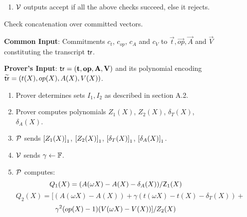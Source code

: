\begin{figure}[htbp]
\begin{mdframed}
{\begin{enumerate}[leftmargin=1em, label=\arabic*.]
\begin{itemize}[leftmargin=1em]
					\item $\kzgverify(\srs,\gone{f},  \val{s}{Z} + r\val{s}{Q}, s,\Pi_f)$.
					\item $\val{s}{Q}\cdot \val{s}{Z} = \val{s^3}{h}-\val{s}{v}-\gamma \val{\omega^m s}{v}-\gamma^2\val{\omega^{2m}s}{v}$.
				\end{itemize}
				\item $\mathcal{V}$ outputs accept if all the above checks succeed, else it rejects.
			\end{enumerate}
		}
	\end{mdframed}
	\caption{Check concatenation over committed vectors.}
	\label{fig:concatenation}
\end{figure}

\begin{figure}[htbp]

    \begin{mdframed}
    {
            {\bf Common Input}: Commitments $c_t$, $c_{op}$, $c_A$ and $c_V$ to $\vec{t},\vec{op},\vec{A}$ and $\vec{V}$ constituting the transcript $\mathsf{tr}$.

            {\bf Prover's Input}: $\mathsf{tr}=(\mathbf{t}, \mathbf{op}, \mathbf{A}, \mathbf{V})$ and its polynomial encoding $\widetilde{\mathsf{tr}}=(t(X), {op}(X), A(X), V(X))$.
        \begin{enumerate}[leftmargin=1em, label=\arabic*]
            \item Prover determines sets $I_1, I_2$ as described in section A.2.
            \item Prover computes polynomials $Z_1(X)$, $Z_2(X)$, $\delta_T(X)$, $\delta_A(X)$.
            \item $\mathcal{P}$ sends $\left[{Z_1(X)}\right]_1$, $\left[{Z_2(X)}\right]_1$, $\left[{\delta_T(X)}\right]_1$, $\left[{\delta_A(X)}\right]_1$.
            \item $\mathcal{V}$ sends $\gamma\gets \mathbb{F}$.
            \item $\mathcal{P}$ computes:
            $$Q_1(X) =  (A(\omega X) - A(X) - \delta_A(X)) / \mathsf{Z}_1(X)$$
            $$Q_2(X) =  [(A(\omega X) - A(X))+\gamma(t(\omega X) - t(X) - \delta_T(X))+$$
            $$ \gamma^2 ({op}(X) - 1)(V(\omega X) - V(X))] / Z_2(X) $$



\end{enumerate}}
\end{mdframed}
\end{figure}
